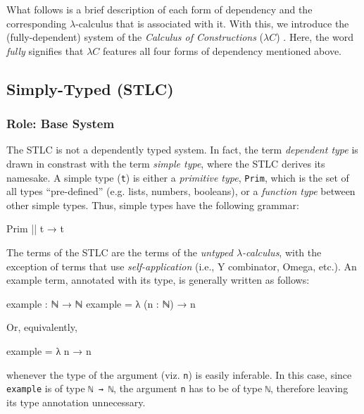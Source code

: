 \documentclass[12pt]{article}
\begin{document}
What follows is a brief description of each form of dependency and the
corresponding \(\lambda\)-calculus that is associated with it. With this, we
introduce the (fully-dependent) system of the \textit{Calculus of Constructions}
(\(\lambda C\)) \cite{}. Here, the word \textit{fully} signifies that \(\lambda C\)
features all four forms of dependency mentioned above.

\subsection*{Simply-Typed (STLC)}
\subsubsection*{Role: Base System}
The STLC is not a dependently typed system. In fact, the term {\em dependent type}
is drawn in constrast with the term {\em simple type}, where the STLC derives
its namesake. A simple type ({\tt t}) is either a {\em primitive type}, {\tt Prim},
which is the set of all types ``pre-defined'' (e.g. lists, numbers, booleans),
or a {\em function type} between other simple types. Thus, simple types have the
following grammar:
\begin{center}
\begin{minipage}{0.5\textwidth}
\begin{code}
Prim || t → t
\end{code}
\end{minipage}
\end{center}
The terms of the STLC are the terms of the \textit{untyped \(\lambda\)-calculus},
with the exception of terms that use \textit{self-application} (i.e., Y
combinator, Omega, etc.). An example term, annotated with its type, is generally
written as follows:
\begin{center}
\begin{minipage}{0.5\textwidth}
\begin{code}
example : ℕ → ℕ
example = λ (n : ℕ) → n
\end{code}
\end{minipage}
\end{center}
Or, equivalently,
\begin{center}
\begin{minipage}{0.5\textwidth}
\begin{code}
example = λ n → n
\end{code}
\end{minipage}
\end{center}
whenever the type of the argument (viz. {\tt n}) is easily inferable. In this
case, since {\tt example} is of type {\tt ℕ → ℕ}, the argument {\tt n} has
to be of type {\tt ℕ}, therefore leaving its type annotation unnecessary.
\end{document}

